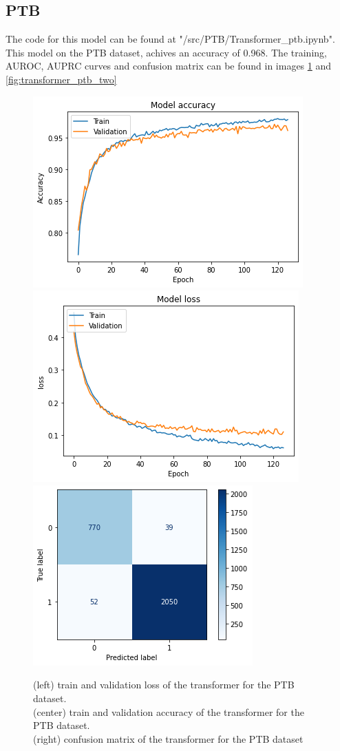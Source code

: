 \documentclass[11pt]{scrartcl}
\begin{document}
\subsection{PTB}
The code for this model can be found at "/src/PTB/Transformer\_ptb.ipynb".
This model on the PTB dataset, achives an accuracy of 0.968. The training, AUROC, AUPRC curves and confusion matrix can  be found in images \ref{fig:tranformer_ptb_three} and \ref{fig:transformer_ptb_two}
\begin{figure}[htp]
\centering
\includegraphics[width=.30\textwidth]{../models_performance_graphs/ptb/transformer_ptb_accuracy.png}\hfill
\includegraphics[width=.30\textwidth]{../models_performance_graphs/ptb/transformer_ptb_loss.png}\hfill
\includegraphics[width=.30\textwidth]{../models_performance_graphs/ptb/transformer_ptb_confusion.png}
\caption{(left) train and validation loss of the transformer for the PTB dataset. \\ (center) train and validation accuracy of the transformer for the PTB dataset. \\(right) confusion matrix of the transformer for the PTB dataset}
\label{fig:tranformer_ptb_three}
\end{figure}
\end{document}
